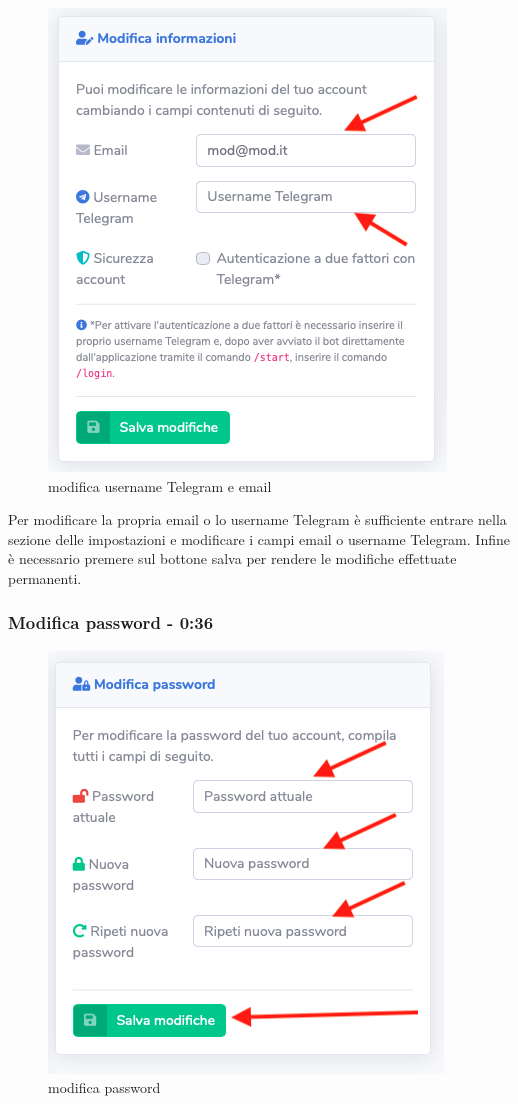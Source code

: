 		\begin{figure}[H]
		\centering
		\includegraphics[scale=0.600]{res/images/membro/modUsername.png}
		\caption{modifica username Telegram e email}
	\end{figure}

		Per modificare la propria email o lo username Telegram è sufficiente entrare nella sezione delle impostazioni e modificare i campi email o username Telegram.
		Infine è necessario premere sul bottone salva per rendere le modifiche effettuate permanenti.

	\subsubsection{Modifica password - 0:36}

		\begin{figure}[H]
		\centering
		\includegraphics[scale=0.600]{res/images/membro/modPassword.png}
		\caption{modifica password}
	\end{figure}


